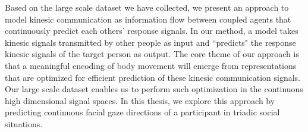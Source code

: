 Based on the large scale dataset we have collected, we present an approach to model kinesic communication as information flow between coupled agents that continuously predict each others' response signals. In our method, a model takes kinesic signals transmitted by other people as input and ``predicts" the response kinesic signals of the target person as output. The core theme of our approach is that a meaningful encoding of body movement will emerge from representations that are optimized for efficient prediction of these kinesic communication signals. Our large scale dataset enables us to perform such optimization in the continuous high dimensional signal spaces. In this thesis, we explore this approach by predicting continuous facial gaze directions of a participant in triadic social situations.


